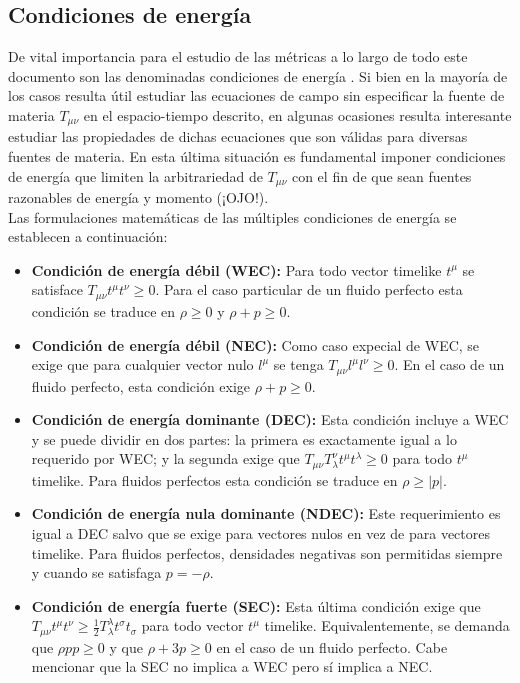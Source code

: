 \documentclass[prb,aps,preprintnumbers,amsmath,amssymb]{article}
\numberwithin{equation}{section}
\begin{document}
\subsection{Condiciones de energía}

De vital importancia para el estudio de las métricas a lo largo de todo este documento son las denominadas condiciones de energía \cite{carroll book}. Si bien en la mayoría de los casos resulta útil estudiar las ecuaciones de campo sin especificar la fuente de materia $T_{\mu \nu}$ en el espacio-tiempo descrito, en algunas ocasiones resulta interesante estudiar las propiedades de dichas ecuaciones que son válidas para diversas fuentes de materia. En esta última situación es fundamental imponer condiciones de energía que limiten la arbitrariedad de $T_{\mu \nu}$ con el fin de que sean fuentes razonables de energía y momento (¡OJO!).\\

Las formulaciones matemáticas de las múltiples  condiciones de energía se establecen a continuación:

\begin{itemize}
\item \textbf{Condición de energía débil (WEC):} Para todo vector timelike $t^\mu$ se satisface $T_{\mu \nu}t^{\mu}t^{\nu} \geq 0$. Para el caso particular de un fluido perfecto esta condición se traduce en $\rho \geq 0$ y $\rho + p \geq 0$.

\item \textbf{Condición de energía débil (NEC):} Como caso expecial de WEC, se exige que para cualquier vector nulo $l^\mu$ se tenga $T_{\mu \nu}l^{\mu}l^{\nu} \geq 0$. En el caso de un fluido perfecto, esta condición exige $\rho + p \geq 0$.

\item \textbf{Condición de energía dominante (DEC):} Esta condición incluye a WEC y se puede dividir en dos partes: la primera es exactamente igual a lo requerido por WEC; y la segunda exige que $T_{\mu \nu}T^{\nu}_{\lambda}t^{\mu}t^{\lambda} \geq 0$ para todo $t^{\mu}$ timelike. Para fluidos perfectos esta condición se traduce en $\rho \geq |p|$.

\item \textbf{Condición de energía nula dominante (NDEC):} Este requerimiento es igual a DEC salvo que se exige para vectores nulos en vez de para vectores timelike. Para fluidos perfectos, densidades negativas son permitidas siempre y cuando se satisfaga $p = -\rho$.

\item \textbf{Condición de energía fuerte (SEC):} Esta última condición exige que $T_{\mu \nu}t^{\mu}t^{\nu} \geq \frac{1}{2}T^{\lambda}_{\lambda}t^{\sigma}t_{\sigma}$ para todo vector $t^\mu$ timelike. Equivalentemente, se demanda que $\rho p p \geq 0$ y que $\rho + 3p \geq 0$ en el caso de un fluido perfecto. Cabe mencionar que la SEC no implica a WEC pero sí implica a NEC.
\end{itemize}
\end{document}
